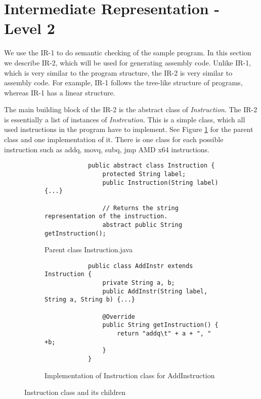 \documentclass{article}[11pt]
\begin{document}
\section{Intermediate Representation - Level 2}
\label{sec:ir2}
We use the IR-1 to do semantic checking of the sample program. In this section we describe IR-2, which will be used for generating assembly code. Unlike IR-1, which is very similar to the program structure, the IR-2 is very similar to assembly code. For example, IR-1 follows the tree-like structure of programs, whereas IR-1 has a linear structure.

The main building block of the IR-2 is the abstract class of \textit{Instruction}. The IR-2 is essentially a list of instances of \textit{Instrcution}. This is a simple class, which all used instructions in the program have to implement. See Figure \ref{code:instructions} for the parent class and one implementation of it. There is one class for each possible instruction such as addq, movq, subq, jmp AMD x64 instructions.

\begin{figure}
    \begin{subfigure}{0.5\linewidth}
        \begin{lstlisting}
            public abstract class Instruction {
                protected String label;
                public Instruction(String label){...}
    
                // Returns the string representation of the instruction.
                abstract public String getInstruction();
        \end{lstlisting}
        \caption{Parent class Instruction.java}
    \end{subfigure}
    \hspace{1cm}
    \begin{subfigure}{0.5\linewidth}
        \begin{lstlisting}
            public class AddInstr extends Instruction {
                private String a, b;
                public AddInstr(String label, String a, String b) {...}
            
                @Override
                public String getInstruction() {
                    return "addq\t" + a + ", " +b;
                }
            }
        \end{lstlisting}
        \caption{Implementation of Instruction class for AddInstruction}
    \end{subfigure}
    \caption{Instruction class and its children}
    \label{code:instructions}
\end{figure}
\end{document}
